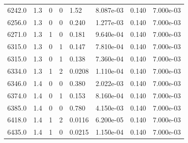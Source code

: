 \documentclass[preview]{standalone}
\begin{document}
{{{{{{{{{{{\begin{tabular}{L{1.2cm}C{1.2cm} C{0.3cm}C{0.5cm} C{1.4cm}C{1.4cm} C{1.4cm}C{1.4cm}}
  6242.0  &   1.3  & 0     &  0 &  1.52  & 8.087e-03  & 0.140 &  7.000e-03   \\ 
  6256.0  &   1.3  & 0     &  0 &  0.240  & 1.277e-03  & 0.140 &  7.000e-03   \\ 
  6271.0  &   1.3  & 1     &  0 &  0.181  & 9.640e-04  & 0.140 &  7.000e-03   \\ 
  6315.0  &   1.3  & 0     &  1 &  0.147  & 7.810e-04  & 0.140 &  7.000e-03   \\ 
  6315.0  &   1.3  & 0     &  1 &  0.138  & 7.360e-04  & 0.140 &  7.000e-03   \\ 
  6334.0  &   1.3  & 1     &  2 &  0.0208  & 1.110e-04  & 0.140 &  7.000e-03   \\ 
  6346.0  &   1.4  & 0     &  0 &  0.380  & 2.022e-03  & 0.140 &  7.000e-03   \\ 
  6374.0  &   1.4  & 0     &  1 &  0.153  & 8.160e-04  & 0.140 &  7.000e-03   \\ 
  6385.0  &   1.4  & 0     &  0 &  0.780  & 4.150e-03  & 0.140 &  7.000e-03   \\ 
  6418.0  &   1.4  & 1     &  2 &  0.0116  & 6.200e-05  & 0.140 &  7.000e-03   \\ 
  6435.0  &   1.4  & 1     &  0 &  0.0215  & 1.150e-04  & 0.140 &  7.000e-03   \\ 
\hline 
\end{tabular} 

}}}}}}}}}}}
\end{document}
